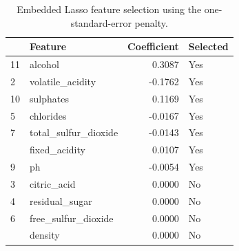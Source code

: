 \begin{table}

\caption{\label{tab:p4-lasso-selection}Embedded Lasso feature selection using the one-standard-error penalty.}
\centering
\begin{tabular}[t]{llrl}
\toprule
  & Feature & Coefficient & Selected\\
\midrule
11 & alcohol & 0.3087 & Yes\\
2 & volatile\_acidity & -0.1762 & Yes\\
10 & sulphates & 0.1169 & Yes\\
5 & chlorides & -0.0167 & Yes\\
7 & total\_sulfur\_dioxide & -0.0143 & Yes\\
\addlinespace
1 & fixed\_acidity & 0.0107 & Yes\\
9 & ph & -0.0054 & Yes\\
3 & citric\_acid & 0.0000 & No\\
4 & residual\_sugar & 0.0000 & No\\
6 & free\_sulfur\_dioxide & 0.0000 & No\\
\addlinespace
8 & density & 0.0000 & No\\
\bottomrule
\end{tabular}
\end{table}
